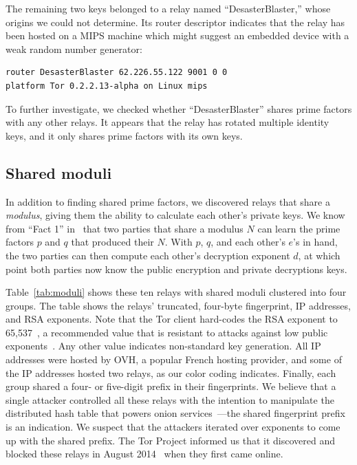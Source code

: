 The remaining two keys belonged to a relay named ``DesasterBlaster,'' whose
origins we could not determine. Its router descriptor indicates that the relay
has been hosted on a MIPS machine which might suggest an embedded device with a
weak random number generator:

\begin{verbatim}
router DesasterBlaster 62.226.55.122 9001 0 0
platform Tor 0.2.2.13-alpha on Linux mips
\end{verbatim}

To further investigate, we checked whether ``DesasterBlaster'' shares prime factors with any other relays. It appears
that the relay has rotated multiple identity keys, and it only shares prime
factors with its own keys.


\subsection{Shared moduli}
\label{sec:shared-moduli}
In addition to finding shared prime factors, we discovered relays that share a
\emph{modulus}, giving them the ability to calculate each other's private keys.
We know from ``Fact 1'' in~\cite[\S~1.1]{Boneh1999a} that two parties 
that share a modulus $N$ can learn the prime factors $p$ and $q$ that produced their $N$. With $p$, $q$, and each other's $e$'s in hand, the two parties can then compute each other's decryption exponent $d$, at which point both parties now know the public encryption and private decryptions keys. 

Table~\ref{tab:moduli} shows these ten relays with shared moduli clustered into four groups. The table shows the relays' truncated,
four-byte fingerprint, IP addresses, and RSA exponents.  Note that the Tor
client hard-codes the RSA exponent to 65,537~\cite[\S~0.3]{torspec}, a
recommended value that is resistant to attacks against low public
exponents~\cite[\S~4]{Boneh1999a}.  Any other value indicates non-standard key
generation.  All IP addresses were hosted by OVH, a popular French hosting
provider, and some of the IP addresses hosted two relays, as our color coding
indicates.  Finally, each group shared a four- or five-digit prefix in their
fingerprints.  We believe that a single attacker controlled all these relays
with the intention to manipulate the distributed hash table that powers onion
services~\cite{Biryukov2013a}---the shared fingerprint prefix is an indication.
We suspect that the attackers iterated over exponents to come up with the shared
prefix.  The Tor Project informed us that it discovered and blocked these relays
in August 2014~\cite{tor-priv1} when they first came online.

